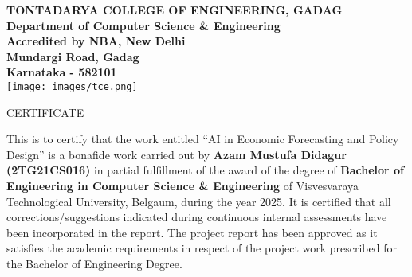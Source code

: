 \begin{center}
    {\large \uppercase{\textbf{Tontadarya College of Engineering, Gadag}}}\\[0.15cm]
    {\large \textbf{Department of Computer Science \& Engineering}}\\[0.15cm]
    {\large \textbf{Accredited by \uppercase{NBA}, New Delhi}}\\[0.3cm]
    {\large \textbf{Mundargi Road, Gadag}}\\[0.2cm]
    {\large \textbf{Karnataka - 582101}}\\[0.3cm]

    \texttt{[image: images/tce.png]}
    \vspace{0.3cm}

    {\Huge \uppercase{Certificate}}\\[0.6cm]
\end{center}

\noindent This is to certify that the work entitled ``AI in Economic Forecasting and Policy Design'' is a bonafide work carried out by \textbf{Azam Mustufa Didagur (2TG21CS016)} in partial fulfillment of the award of the degree of \textbf{Bachelor of Engineering in Computer Science \& Engineering} of Visvesvaraya Technological University, Belgaum, during the year 2025. It is certified that all corrections/suggestions indicated during continuous internal assessments have been incorporated in the report. The project report has been approved as it satisfies the academic requirements in respect of the project work prescribed for the Bachelor of Engineering Degree.

\vspace{0.6cm}

